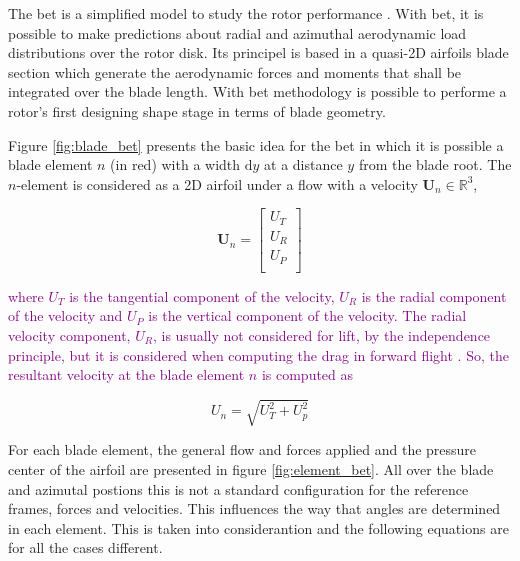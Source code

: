 The \gls{bet} is a simplified model to study the rotor performance \cite{leishman_principles_2006}. With \gls{bet}, it is possible to make predictions about radial and azimuthal aerodynamic load distributions over the rotor disk. Its principel is based in a quasi-2D airfoils blade section which generate the aerodynamic forces and moments that shall be integrated over the blade length. With \gls{bet} methodology is possible to performe a rotor's first designing shape stage in terms of blade geometry.

Figure \ref{fig:blade_bet} presents the basic idea for the \gls{bet} in which it is possible a blade element $n$ (in red) with a width $\mathrm{d}y$ at a distance $y$ from the blade root. The $n$-element is considered as a 2D airfoil under a flow with a velocity $\mathbf{U}_n \in \mathbb{R}^3$,

\begin{equation}
    \mathbf{U}_n = 
    \begin{bmatrix}
        U_T \\
        U_R \\
        U_P \\
    \end{bmatrix}
\end{equation}

\textcolor{purple}{
\noindent where $U_T$ is the tangential component of the velocity, $U_R$ is the radial component of the velocity and $U_P$ is the vertical component of the velocity. The radial velocity component, $U_R$, is usually not considered for lift, by the independence principle, but it is considered when computing the drag in forward flight \cite{leishman_principles_2006}. So, the resultant velocity at the blade element $n$ is computed as}

\begin{equation}
    U_n = \sqrt{U_T^2 + U_p^2}
\end{equation}


For each blade element, the general flow and forces applied and the pressure center of the airfoil are presented in figure \ref{fig:element_bet}. All over the blade and azimutal postions this is not a standard configuration for the reference frames, forces and velocities. This influences the way that angles are determined in each element. This is taken into considerantion and the following equations are for all the cases different.


